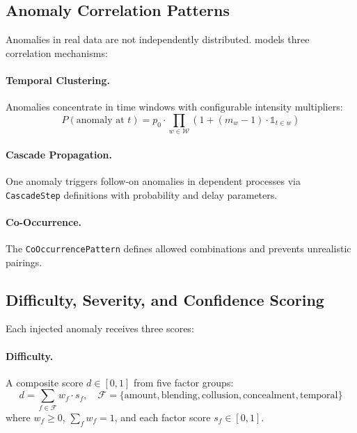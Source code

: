 \subsection{Anomaly Correlation Patterns}
\label{sec:anom_correlation}

Anomalies in real data are not independently distributed.  \system{}
models three correlation mechanisms:

\paragraph{Temporal Clustering.}
Anomalies concentrate in time windows with configurable intensity
multipliers:
\begin{equation}
P(\text{anomaly at } t) = p_0 \cdot
  \prod_{w \in \mathcal{W}} \left(1 + (m_w - 1) \cdot
  \mathbb{1}_{t \in w}\right)
\end{equation}

\paragraph{Cascade Propagation.}
One anomaly triggers follow-on anomalies in dependent processes via
\texttt{CascadeStep} definitions with probability and delay parameters.

\paragraph{Co-Occurrence.}
The \texttt{CoOccurrencePattern} defines allowed combinations and
prevents unrealistic pairings.

\subsection{Difficulty, Severity, and Confidence Scoring}
\label{sec:anom_scoring}

Each injected anomaly receives three scores:

\paragraph{Difficulty.}
A composite score $d \in [0, 1]$ from five factor groups:
\begin{equation}
d = \sum_{f \in \mathcal{F}} w_f \cdot s_f, \quad
\mathcal{F} = \{\text{amount}, \text{blending}, \text{collusion},
  \text{concealment}, \text{temporal}\}
\label{eq:difficulty}
\end{equation}
where $w_f \geq 0$, $\sum_f w_f = 1$, and each factor score
$s_f \in [0, 1]$.

